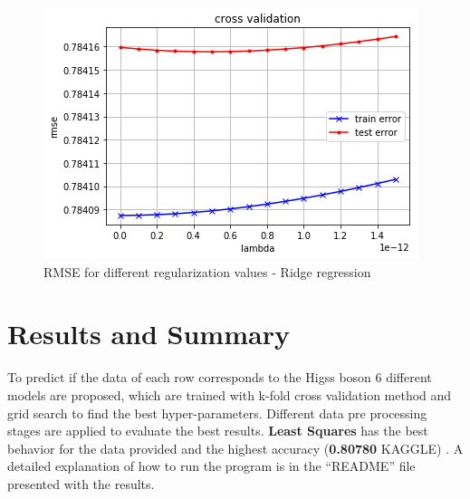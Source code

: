 \documentclass[10pt,conference,compsocconf]{IEEEtran}
\begin{document}
\begin{figure}[H]
  \centering
  \includegraphics[width=\columnwidth]{cross_validation_lambda}
  \caption{RMSE for different regularization values - Ridge regression}
  \vspace{-3mm}
  \label{fig:best_lambda}
\end{figure}



\section{Results and Summary}
To predict if the data of each row corresponds to the Higss boson
6 different models are proposed, which are trained with k-fold cross validation
method and grid search to find the best hyper-parameters. 
Different data pre processing stages are applied to evaluate the best results. 
\textbf{Least Squares} has the best behavior for the data provided and 
the highest accuracy (\textbf{0.80780} KAGGLE) .
A detailed explanation of how to run the program is
in the ``README'' file presented with the results.




\end{document}
